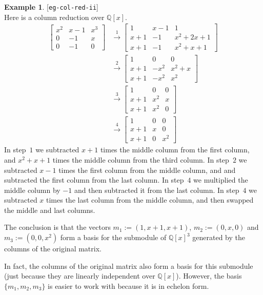 \documentclass{amsart}
\newcommand{\lbl}[1]{\label{#1}\textup{[\texttt{#1}]}\ \\}
\newcommand{\lbl}{\label}
\newcommand{\bbm}       {\left[\begin{matrix}}
\newcommand{\ebm}       {\end{matrix}\right]}
\newcommand{\Q}         {{\mathbb{Q}}}
\newcommand{\xra}       {\xrightarrow}
\renewcommand{\:}{\colon}
\theoremstyle{definition}
\newtheorem{example}[theorem]{Example}
\begin{document}
\begin{example}\lbl{eg-col-red-ii}
 Here is a column reduction over $\Q[x]$.
 \begin{align*}
           \bbm x^2 & x-1 & x^3 \\ 0 & -1 & x \\ 0 & -1 & 0 \ebm 
  &\xra{1} \bbm 1&x-1&1\\x+1 & -1 & x^2+2x+1\\ x+1&-1&x^2+x+1\ebm\\
  &\xra{2} \bbm 1&0&0 \\ x+1&-x^2&x^2+x\\ x+1&-x^2&x^2 \ebm \\
  &\xra{3} \bbm 1&0&0 \\ x+1&x^2&x \\ x+1&x^2& 0 \ebm\\
  &\xra{4} \bbm 1&0&0 \\ x+1&x&0 \\ x+1&0&x^2 \ebm
 \end{align*}
 In step~$1$ we subtracted $x+1$ times the middle column from the
 first column, and $x^2+x+1$ times the middle column from the third
 column.  In step~$2$ we subtracted $x-1$ times the first column from
 the middle column, and and subtracted the first column from the last
 column.  In step~$4$ we multiplied the middle column by $-1$ and then
 subtracted it from the last column.  In step~$4$ we subtracted $x$
 times the last column from the middle column, and then swapped the
 middle and last columns.

 The conclusion is that the vectors $m_1:=(1,x+1,x+1)$, $m_2:=(0,x,0)$
 and $m_3:=(0,0,x^2)$ form a basis for the submodule of $\Q[x]^3$
 generated by the columns of the original matrix.

 In fact, the columns of the original matrix also form a basis for
 this submodule (just because they are linearly independent over
 $\Q[x]$).  However, the basis $\{m_1,m_2,m_3\}$ is easier to work
 with because it is in echelon form.
\end{example}
\end{document}
